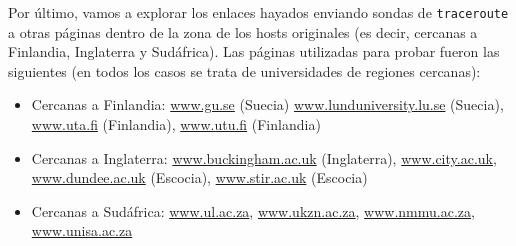 Por \'ultimo, vamos a explorar los enlaces hayados enviando sondas de \texttt{traceroute} a otras p\'aginas dentro de la zona de los hosts originales (es decir, cercanas a Finlandia, Inglaterra y Sudáfrica). Las páginas utilizadas para probar fueron las siguientes (en todos los casos se trata de universidades de regiones cercanas):

\begin{itemize}
 \item Cercanas a Finlandia: \url{www.gu.se} (Suecia) \url{www.lunduniversity.lu.se} (Suecia), \url{www.uta.fi} (Finlandia), \url{www.utu.fi} (Finlandia)
 \item Cercanas a Inglaterra: \url{www.buckingham.ac.uk} (Inglaterra), \url{www.city.ac.uk}, \url{www.dundee.ac.uk} (Escocia), \url{www.stir.ac.uk} (Escocia)
 \item Cercanas a Sudáfrica: \url{www.ul.ac.za}, \url{www.ukzn.ac.za}, \url{www.nmmu.ac.za}, \url{www.unisa.ac.za}
\end{itemize}


 
